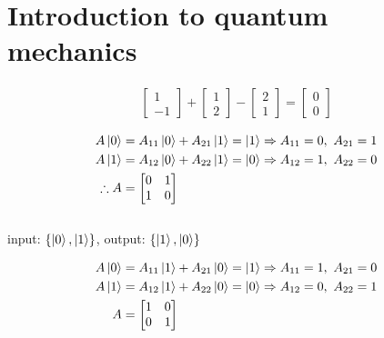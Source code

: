 \setcounter{chapter}{1}
\chapter{Introduction to quantum mechanics}

\begin{align*}
	\begin{bmatrix}
		1 \\
		-1
	\end{bmatrix}
	+
	\begin{bmatrix}
		1 \\
		2
	\end{bmatrix}
	-
	\begin{bmatrix}
		2 \\
		1
	\end{bmatrix}
	=
	\begin{bmatrix}
		0 \\
		0
	\end{bmatrix}
\end{align*}


\begin{align*}
	A\ket{0} &= A_{11}\ket{0} + A_{21}\ket{1} = \ket{1} \Rightarrow A_{11} = 0,\ A_{21} = 1\\
	A\ket{1} &= A_{12}\ket{0} + A_{22}\ket{1} = \ket{0} \Rightarrow A_{12} = 1,\ A_{22} = 0\\
%
	\therefore A &=
	\begin{bmatrix}
		0 & 1 \\
		1 & 0
	\end{bmatrix}
\end{align*}\\

input: $\left\{\ket{0}, \ket{1}\right\}$,
output: $\left\{\ket{1}, \ket{0}\right\}$

\begin{align*}
	A\ket{0}&= A_{11}\ket{1} + A_{21}\ket{0} = \ket{1} \Rightarrow A_{11} = 1,\ A_{21} = 0\\
%
	A\ket{1} &= A_{12}\ket{1} + A_{22}\ket{0} = \ket{0} \Rightarrow A_{12} = 0,\ A_{22} = 1\\
%
	A &=
	\begin{bmatrix}
	1 & 0 \\
	0 & 1
	\end{bmatrix}
\end{align*}



